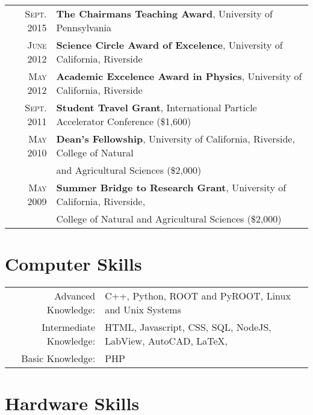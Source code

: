 \documentclass[a4paper,10pt]{article} %
\begin{document}
\begin{tabular}{rl}
\textsc{Sept.} 2015 & \textbf{The Chairmans Teaching Award}, University of Pennsylvania \\
\textsc{June} 2012  & \textbf{Science Circle Award of Excelence}, University of California, Riverside \\
\textsc{May} 2012   & \textbf{Academic Excelence Award in Physics}, University of California, Riverside \\
\textsc{Sept.} 2011 & \textbf{Student Travel Grant}, International Particle Accelerator Conference \footnotesize(\$1,600)\normalsize\\
\textsc{May} 2010   & \textbf{Dean's Fellowship}, University of California, Riverside, College of Natural\\
				    & and Agricultural Sciences \footnotesize(\$2,000)\normalsize\\
\textsc{May} 2009   & \textbf{Summer Bridge to Research Grant}, University of California, Riverside, \\
			        & College of Natural and Agricultural Sciences \footnotesize(\$2,000)\normalsize\\

\end{tabular}


\section{Computer Skills}

\begin{tabular}{rl}

Advanced Knowledge: & C++, Python, ROOT and PyROOT, Linux and Unix Systems \\
Intermediate Knowledge: & HTML, Javascript, CSS, SQL, NodeJS, LabView, AutoCAD, \LaTeX, \\
Basic Knowledge:        & PHP
\end{tabular}


\section{Hardware Skills}
\end{document}
